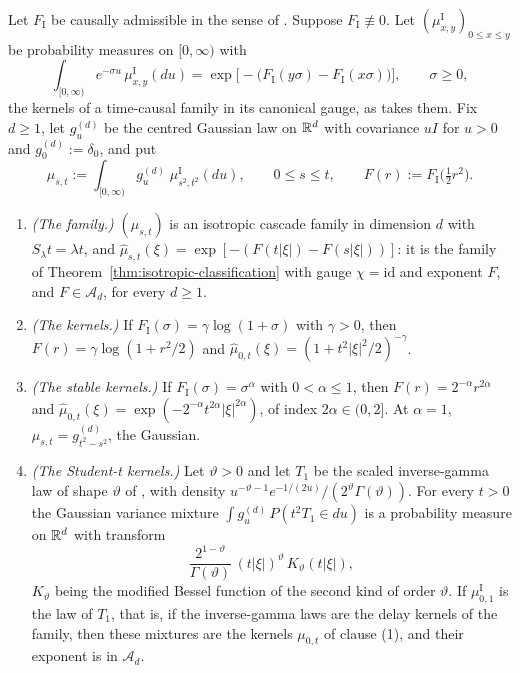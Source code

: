 \begin{proposition}\label{prop:isotropic-bridge}
Let $F_{\mathrm I}$ be causally admissible in the sense of .
Suppose $F_{\mathrm I} \not\equiv 0$. Let $(\mu^{\mathrm I}_{x,y})_{0 \le x \le y}$ be probability
measures on $[0,\infty)$ with
\[
  \int_{[0,\infty)} e^{-\sigma u}\,\mu^{\mathrm I}_{x,y}(du)
   = \exp\bigl[-\bigl(F_{\mathrm I}(y\sigma) - F_{\mathrm I}(x\sigma)\bigr)\bigr], \qquad \sigma \ge 0 ,
\]
the kernels of a time-causal family in its canonical gauge, as  takes them. Fix
$d \ge 1$, let $g^{(d)}_u$ be the centred Gaussian law on $\mathbb{R}^d$ with covariance $uI$ for $u > 0$
and $g^{(d)}_0 := \delta_0$, and put
\begin{equation}\label{eq:isotropic-bridge}
  \mu_{s,t} := \int_{[0,\infty)} g^{(d)}_u\;\mu^{\mathrm I}_{s^2,t^2}(du), \qquad 0 \le s \le t,
  \qquad F(r) := F_{\mathrm I}\bigl(\tfrac12 r^2\bigr) .
\end{equation}
\begin{enumerate}
\item \emph{(The family.)} $(\mu_{s,t})$ is an isotropic cascade family in dimension $d$ with
$S_\lambda t = \lambda t$, and
$\widehat\mu_{s,t}(\xi) = \exp[-(F(t|\xi|) - F(s|\xi|))]$: it is the family of
Theorem~\ref{thm:isotropic-classification} with gauge $\chi = \mathrm{id}$ and exponent $F$, and
$F \in \mathcal{A}_d$, for every $d \ge 1$.
\item \emph{(The \Matern{} kernels.)} If $F_{\mathrm I}(\sigma) = \gamma\log(1+\sigma)$ with
$\gamma > 0$, then $F(r) = \gamma\log(1 + r^2/2)$ and
$\widehat\mu_{0,t}(\xi) = (1 + t^2|\xi|^2/2)^{-\gamma}$.
\item \emph{(The stable kernels.)} If $F_{\mathrm I}(\sigma) = \sigma^\alpha$ with
$0 < \alpha \le 1$, then $F(r) = 2^{-\alpha}r^{2\alpha}$ and
$\widehat\mu_{0,t}(\xi) = \exp(-2^{-\alpha}t^{2\alpha}|\xi|^{2\alpha})$, of index
$2\alpha \in (0,2]$. At $\alpha = 1$, $\mu_{s,t} = g^{(d)}_{t^2-s^2}$, the Gaussian.
\item \emph{(The Student-t kernels.)} Let $\vartheta > 0$ and let $T_1$ be the scaled
inverse-gamma law of shape $\vartheta$ of , with density
$u^{-\vartheta-1}e^{-1/(2u)}/(2^\vartheta\Gamma(\vartheta))$. For every
$t > 0$ the Gaussian variance mixture $\int g^{(d)}_u\,P(t^2T_1 \in du)$ is a probability measure
on $\mathbb{R}^d$ with transform
\[
  \frac{2^{1-\vartheta}}{\Gamma(\vartheta)}\,(t|\xi|)^\vartheta\,K_\vartheta(t|\xi|) ,
\]
$K_\vartheta$ being the modified Bessel function of the second kind of order $\vartheta$.
If $\mu^{\mathrm I}_{0,1}$ is the law of $T_1$, that is, if the inverse-gamma laws are the
delay kernels of the family, then these mixtures are the kernels $\mu_{0,t}$ of
clause (1), and their exponent is in $\mathcal{A}_d$.
\end{enumerate}
\end{proposition}

